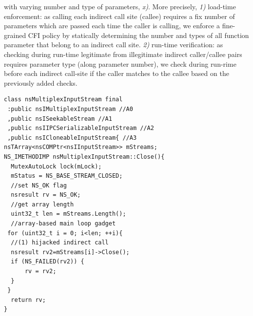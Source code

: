 with varying number and type of parameters, \textit{x)}.
More precisely, 
\textit{1)} load-time enforcement: as calling each indirect call site (callee) requires 
a fix number of parameters which are passed each time the caller is calling, we
enforce a fine-grained CFI policy by statically determining the number and types of all function parameter
that belong to an indirect call site.
\textit{2)} run-time verification: as checking during run-time legitimate from
illegitimate indirect caller/callee pairs requires parameter type (along parameter number),
we check during run-rime before each indirect call-site if the caller matches to the callee 
based on the previously added checks.

\newsavebox{\firstlisting}
\begin{lrbox}{\firstlisting}
\begin{minipage}[c]{0.4\linewidth}
\begin{verbatim}
class nsMultiplexInputStream final 
 :public nsIMultiplexInputStream //A0
 ,public nsISeekableStream //A1
 ,public nsIIPCSerializableInputStream //A2
 ,public nsICloneableInputStream{ //A3
nsTArray<nsCOMPtr<nsIInputStream>> mStreams;
NS_IMETHODIMP nsMultiplexInputStream::Close(){
  MutexAutoLock lock(mLock);
  mStatus = NS_BASE_STREAM_CLOSED;
  //set NS_OK flag
  nsresult rv = NS_OK;
  //get array length
  uint32_t len = mStreams.Length();
  //array-based main loop gadget
 for (uint32_t i = 0; i<len; ++i){
  //(1) hijacked indirect call
  nsresult rv2=mStreams[i]->Close();
  if (NS_FAILED(rv2)) {
      rv = rv2;
  }
 }
  return rv;
}
\end{verbatim}
\end{minipage}
\end{lrbox}


